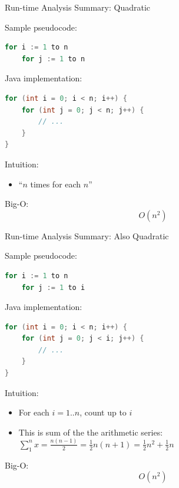 \documentclass{beamer}
\begin{document}
\begin{frame}[fragile]{Run-time Analysis Summary: Quadratic}

Sample pseudocode:
\begin{lstlisting}[language=Python]
for i := 1 to n
    for j := 1 to n
\end{lstlisting}
Java implementation:
\begin{lstlisting}[language=Java]
for (int i = 0; i < n; i++) {
    for (int j = 0; j < n; j++) {
        // ...
    }
}
\end{lstlisting}
Intuition:
\begin{itemize}
\item ``$n$ times for each $n$''
\end{itemize}
Big-O:
\[
O(n^2)
\]

\end{frame}

\begin{frame}[fragile]{Run-time Analysis Summary: Also Quadratic}

Sample pseudocode:
\begin{lstlisting}[language=Python]
for i := 1 to n
    for j := 1 to i
\end{lstlisting}
Java implementation:
\begin{lstlisting}[language=Java]
for (int i = 0; i < n; i++) {
    for (int j = 0; j < i; j++) {
        // ...
    }
}
\end{lstlisting}
Intuition:
\begin{itemize}
\item For each $i = 1 .. n$, count up to $i$
\item This is sum of the the arithmetic series: $\sum_1^n x = \frac{n(n-1)}{2} = \frac{1}{2}n(n+1) = \frac{1}{2}n^2 + \frac{1}{2}n$
\end{itemize}
Big-O:
\[
O(n^2)
\]

\end{frame}
\end{document}
